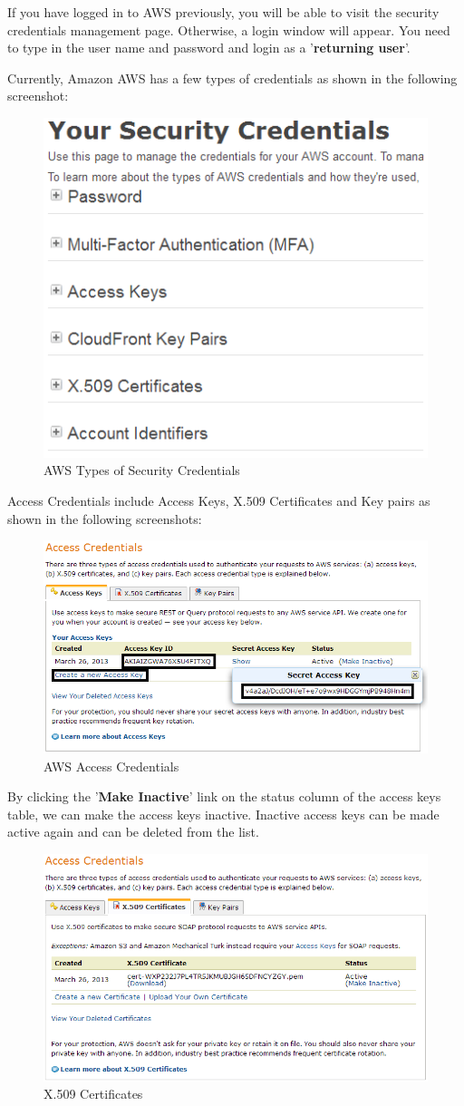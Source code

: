 If you have logged in to AWS previously, you will be able to visit the security credentials management page. Otherwise, a login window will appear. You need to type in the user name and password and login as a '\textbf{returning user}'.

Currently, Amazon AWS has a few types of credentials as shown in the following screenshot:
\begin{figure}[ht]
  \centering
  \includegraphics[width=.50\textwidth]{figs/5163os_08_08.png}
  \caption{AWS Types of Security Credentials}\label{fig:aws.credentials.types}
\end{figure} 
Access Credentials include Access Keys, X.509 Certificates and Key pairs as shown in the following screenshots:
\begin{figure}[ht]
  \centering
  \includegraphics[width=.8\textwidth]{figs/5163os_08_09.png}
  \caption{AWS Access Credentials}\label{fig:aws.access.credentials}
\end{figure} 
By clicking the '\textbf{Make Inactive}' link on the status column of the access keys table, we can make the access keys inactive. Inactive access keys can be made active again and can be deleted from the list.
\begin{figure}[ht]
  \centering
  \includegraphics[width=.8\textwidth]{figs/5163os_08_11.png}
  \caption{X.509 Certificates}\label{fig:aws.x509certificates}
\end{figure} 
